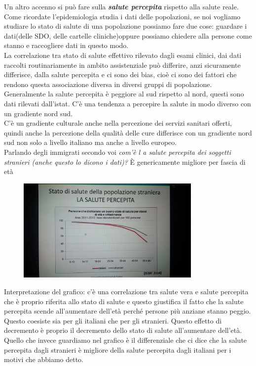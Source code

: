 Un altro accenno si può fare sulla \textbf{\emph{salute percepita}}
rispetto alla salute reale.\\
Come ricordate l'epidemiologia studia i dati delle popolazioni, se noi
vogliamo studiare lo stato di salute di una popolazione possiamo fare
due cose: guardare i dati(delle SDO, delle cartelle cliniche)oppure
possiamo chiedere alla persone come stanno e raccogliere dati in questo
modo.\\
La correlazione tra stato di salute effettivo rilevato dagli esami
clinici, dai dati raccolti routinariamente in ambito assistenziale può
differire, anzi sicuramente differisce, dalla salute percepita e ci sono
dei bias, cioè ci sono dei fattori che rendono questa associazione
diversa in diversi gruppi di popolazione. Generalmente la salute
percepita è peggiore al sud rispetto al nord, questi sono dati rilevati
dall'istat. C'è una tendenza a percepire la salute in modo diverso con
un gradiente nord sud.\\
C'è un gradiente culturale anche nella percezione dei servizi sanitari
offerti, quindi anche la percezione della qualità delle cure differisce
con un gradiente nord sud non solo a livello italiano ma anche a livello
europeo.\\
Parlando degli immigrati secondo voi \emph{com'è l a salute percepita
dei soggetti stranieri (anche questo lo dicono i dati)?} È genericamente
migliore per fascia di età

\begin{figure}[!ht]
\centering
	\includegraphics[width=0.8\textwidth]{27/image2.jpeg}
	\end{figure}

Interpretazione del grafico: c'è una correlazione tra salute vera e
salute percepita che è proprio riferita allo stato di salute e questo
giustifica il fatto che la salute percepita scende all'aumentare
dell'età perché persone più anziane stanno peggio. Questo coesiste sia
per gli italiani che per gli stranieri. Questo effetto di decremento è
proprio il decremento dello stato di salute all'aumentare dell'età.\\
Quello che invece guardiamo nel grafico è il differenziale che ci dice
che la salute percepita dagli stranieri è migliore della salute
percepita dagli italiani per i motivi che abbiamo detto.

